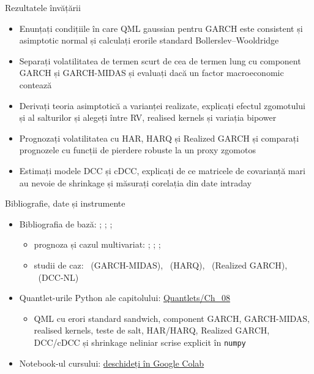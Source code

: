 \begin{frame}{Rezultatele învățării}
\itemsize{\small}
\begin{itemize}
    \item Enunțați condițiile în care QML gaussian pentru GARCH este consistent și asimptotic normal și calculați erorile standard Bollerslev--Wooldridge
    \item Separați volatilitatea de termen scurt de cea de termen lung cu component GARCH și GARCH-MIDAS și evaluați dacă un factor macroeconomic contează
    \item Derivați teoria asimptotică a varianței realizate, explicați efectul zgomotului și al salturilor și alegeți între RV, realised kernels și variația bipower
    \item Prognozați volatilitatea cu HAR, HARQ și Realized GARCH și comparați prognozele cu funcții de pierdere robuste la un proxy zgomotos
    \item Estimați modele DCC și cDCC, explicați de ce matricele de covarianță mari au nevoie de shrinkage și măsurați corelația din date intraday
\end{itemize}
\end{frame}

\begin{frame}{Bibliografie, date și instrumente}
\itemsize{\small}
\begin{itemize}
    \item Bibliografia de bază: ; ; ; 
    \begin{itemize}
        \item prognoza și cazul multivariat: ; ; ; 
        \item studii de caz: \ (GARCH-MIDAS), \ (HARQ), \ (Realized GARCH), \ (DCC-NL)
    \end{itemize}
    \item Quantlet-urile Python ale capitolului: \href{https://github.com/danpele/Advanced-Time-Series/tree/main/Quantlets/Ch_08}{Quantlets/Ch\_08}
    \begin{itemize}
        \item QML cu erori standard sandwich, component GARCH, GARCH-MIDAS, realised kernels, teste de salt, HAR/HARQ, Realized GARCH, DCC/cDCC și shrinkage neliniar scrise explicit în \texttt{numpy}
    \end{itemize}
    \item Notebook-ul cursului: \href{\colaburl{notebooks/EN/chapter8_lecture_notebook.ipynb}}{deschideți în Google Colab}
\end{itemize}
\end{frame}

